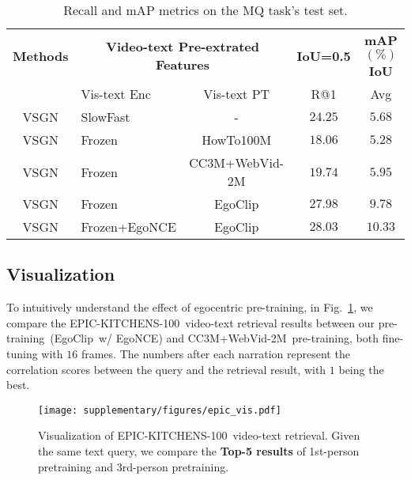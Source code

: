 \documentclass{article}
\newcommand{\dataset}{EgoClip}
\newcommand{\model}{EgoNCE\xspace}
\newcommand{\epic}{EPIC-KITCHENS-100}
\newcommand{\ccweb}{CC3M+WebVid-2M}
\newcommand{\howto}{HowTo100M}
\begin{document}
\begin{table}[htb]
\centering
{
\begin{tabular}{clc|cc}
	\toprule
	\textbf{Methods} & \multicolumn{2}{c|}{\textbf{Video-text Pre-extrated Features}} & \multicolumn{1}{c}{\textbf{IoU=0.5}} & \multicolumn{1}{c}{\textbf{mAP$(\%)$IoU}} \\
	& Vis-text Enc & Vis-text PT & R@1  & Avg \\  \midrule[1pt] 
	VSGN &  SlowFast & - & $24.25$  & $5.68$   \\ \midrule
	VSGN & Frozen & \howto&  $18.06$  & $5.28$   \\
	VSGN & Frozen & \ccweb  & $19.74$  & $5.95$   \\
	VSGN & Frozen & \dataset  & \underline{$27.98$}  & \underline{$9.78$}   \\
	VSGN & Frozen+\model & \dataset & $\mathbf{28.03}$  & $\mathbf{10.33}$   \\
	\bottomrule
\end{tabular}
}
\vspace{0.4em}
\centering
\caption{Recall and mAP metrics on the MQ task's test set.}
\label{mq_test}
\vspace{-0.5cm}
\end{table} 
\subsection{Visualization}
To intuitively understand the effect of egocentric pre-training, in Fig.~\ref{fig_epic_vis}, we compare the \epic~video-text retrieval results between our pre-training~(\dataset~w/ \model) and \ccweb~pre-training, both fine-tuning with $16$ frames. 
The numbers after each narration represent the correlation scores between the query and the retrieval result, with $1$ being the best.
\begin{figure}[htb]
\centering
\vspace{-0.3cm}
\centering
\texttt{[image: supplementary/figures/epic\_vis.pdf]}
\label{case_1}
\centering
\vspace{-0.4em}
\caption{Visualization of \epic~video-text retrieval. 
Given the same text query, we compare the \textbf{Top-5 results} of 1st-person pretraining and 3rd-person pretraining.}
\label{fig_epic_vis}
\end{figure}  
\end{document}
